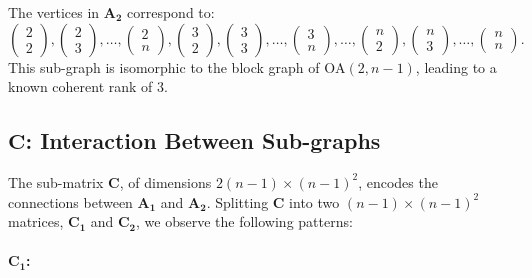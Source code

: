 \documentclass{article}
\begin{document}
The vertices in \( \mathbf{A_2} \) correspond to:
\[
\begin{pmatrix} 2 \\ 2 \end{pmatrix}, \begin{pmatrix} 2 \\ 3 \end{pmatrix}, \dots, \begin{pmatrix} 2 \\ n \end{pmatrix}, \begin{pmatrix} 3 \\ 2 \end{pmatrix}, \begin{pmatrix} 3 \\ 3 \end{pmatrix}, \dots, \begin{pmatrix} 3 \\ n \end{pmatrix}, \dots, \begin{pmatrix} n \\ 2 \end{pmatrix}, \begin{pmatrix} n \\ 3 \end{pmatrix}, \dots, \begin{pmatrix} n \\ n \end{pmatrix}.
\]
This sub-graph is isomorphic to the block graph of \( \text{OA}(2, n-1) \), leading to a known coherent rank of 3.

\subsection{\( \mathbf{C} \): Interaction Between Sub-graphs}

The sub-matrix \( \mathbf{C} \), of dimensions \( 2(n-1) \times (n-1)^2 \), encodes the connections between \( \mathbf{A_1} \) and \( \mathbf{A_2} \). Splitting \( \mathbf{C} \) into two \( (n-1) \times (n-1)^2 \) matrices, \( \mathbf{C_1} \) and \( \mathbf{C_2} \), we observe the following patterns:

\paragraph{\( \mathbf{C_1} \):}
\end{document}
